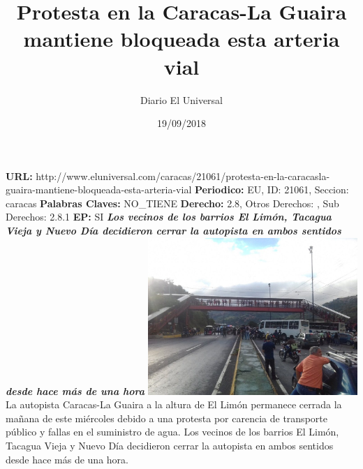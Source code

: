 \documentclass{article}%
\title{\textbf{Protesta en la Caracas{-}La Guaira mantiene bloqueada esta arteria vial}}%
\author{Diario El Universal}%
\date{19/09/2018}%
\begin{document}
%
\normalsize%
\maketitle%
\textbf{URL: }%
http://www.eluniversal.com/caracas/21061/protesta{-}en{-}la{-}caracasla{-}guaira{-}mantiene{-}bloqueada{-}esta{-}arteria{-}vial\newline%
%
\textbf{Periodico: }%
EU, %
ID: %
21061, %
Seccion: %
caracas\newline%
%
\textbf{Palabras Claves: }%
NO\_TIENE\newline%
%
\textbf{Derecho: }%
2.8, %
Otros Derechos: %
, %
Sub Derechos: %
2.8.1\newline%
%
\textbf{EP: }%
SI\newline%
\newline%
%
\textbf{\textit{Los vecinos de los barrios El Limón, Tacagua Vieja y Nuevo Día decidieron cerrar la autopista en ambos sentidos desde hace más de una hora}}%
\newline%
\newline%
%
\includegraphics[width=300px]{69.jpg}%
\newline%
%
La autopista Caracas{-}La Guaira a la altura de El Limón permanece cerrada la mañana de este miércoles debido a una protesta por carencia de transporte público y fallas en el suministro de agua.%
\newline%
%
Los vecinos de los barrios El Limón, Tacagua Vieja y Nuevo Día decidieron cerrar la autopista en ambos sentidos desde hace más de una hora.%
\newline%
%
\end{document}
